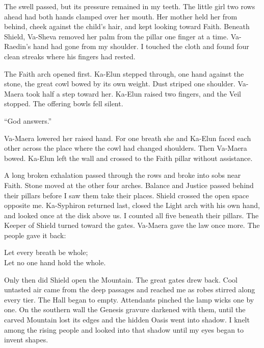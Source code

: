 The swell passed, but its pressure remained in my teeth. The little girl two rows ahead had both hands clamped over her mouth. Her mother held her from behind, cheek against the child's hair, and kept looking toward Faith. Beneath Shield, Va-Sheva removed her palm from the pillar one finger at a time. Va-Raedin's hand had gone from my shoulder. I touched the cloth and found four clean streaks where his fingers had rested.\par

The Faith arch opened first. Ka-Elun stepped through, one hand against the stone, the great cowl bowed by its own weight. Dust striped one shoulder. Va-Maera took half a step toward her. Ka-Elun raised two fingers, and the Veil stopped. The offering bowls fell silent.\par

``God answers.''\par

Va-Maera lowered her raised hand. For one breath she and Ka-Elun faced each other across the place where the cowl had changed shoulders. Then Va-Maera bowed. Ka-Elun left the wall and crossed to the Faith pillar without assistance.\par

A long broken exhalation passed through the rows and broke into sobs near Faith. Stone moved at the other four arches. Balance and Justice passed behind their pillars before I saw them take their places. Shield crossed the open space opposite me. Ka-Syphiron returned last, closed the Light arch with his own hand, and looked once at the disk above us. I counted all five beneath their pillars. The Keeper of Shield turned toward the gates. Va-Maera gave the law once more. The people gave it back:\par

\begin{scripture}
Let every breath be whole;\\
Let no one hand hold the whole.
\end{scripture}

Only then did Shield open the Mountain. The great gates drew back. Cool untasted air came from the deep passages and reached me as robes stirred along every tier. The Hall began to empty. Attendants pinched the lamp wicks one by one. On the southern wall the Genesis gravure darkened with them, until the carved Mountain lost its edges and the hidden Oasis went into shadow. I knelt among the rising people and looked into that shadow until my eyes began to invent shapes.\par


